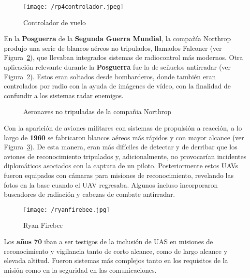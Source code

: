 \begin{figure}[!h]
\begin{center}
\texttt{[image: /rp4controlador.jpeg]}
\caption[Caption]{Controlador de vuelo}
\label{fig:controlador}
\end{center}
\end{figure}

En la \textbf{Posguerra} de la \textbf{Segunda Guerra Mundial}, la compañía Northrop produjo una serie de blancos aéreos no tripulados, llamados Falconer (ver Figura~\ref{fig:northrop}), que llevaban integrados sistemas de radiocontrol más modernos. 
Otra aplicación relevante durante la \textbf{Posguerra} fue la de señuelos antirradar (ver Figura~\ref{fig:northrop}). Estos eran soltados desde bombarderos, donde también eran controlados por radio con la ayuda de imágenes de vídeo, con la finalidad de confundir a los sistemas radar enemigos.

\begin{figure}[!h]
\begin{center}
\caption[Caption]{Aeronaves no tripuladas de la compañia Northrop}
\label{fig:northrop}
\end{center}
\end{figure}

Con la aparición de aviones militares con sistemas de propulsión a reacción, a lo largo de \textbf{1960}
se fabricaron blancos aéreos más rápidos y con mayor alcance (ver Figura~\ref{fig:ryanfirebee}). De esta manera, eran más difíciles de detectar y de derribar que los aviones de reconocimiento tripulados y, adicionalmente, no provocarían incidentes diplomáticos asociados con la captura de un piloto. 
Posteriormente estos \acs{UAV}s fueron equipados con cámaras para misiones de reconocimiento, revelando las fotos en la base cuando el \acs{UAV} regresaba. Algunos incluso incorporaron buscadores de radiación y cabezas de combate antirradar.

\begin{figure}[!h]
\begin{center}
\texttt{[image: /ryanfirebee.jpg]}
\caption[Caption]{Ryan Firebee}
\label{fig:ryanfirebee}
\end{center}
\end{figure}

Los \textbf{años 70} iban a ser testigos de la inclusión de \acs{UAS} en misiones de 
reconocimiento y vigilancia tanto de corto alcance, como de largo alcance y elevada altitud. Fueron sistemas 
más complejos tanto en los requisitos de la misión como en la seguridad en las comunicaciones.


